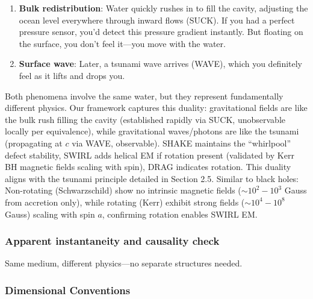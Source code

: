 \begin{enumerate}
\item \textbf{Bulk redistribution}: Water quickly rushes in to fill the cavity, adjusting the ocean level everywhere through inward flows (SUCK). If you had a perfect pressure sensor, you'd detect this pressure gradient instantly. But floating on the surface, you don't feel it---you move with the water.
\item \textbf{Surface wave}: Later, a tsunami wave arrives (WAVE), which you definitely feel as it lifts and drops you.
\end{enumerate}

Both phenomena involve the same water, but they represent fundamentally different physics. Our framework captures this duality: gravitational fields are like the bulk rush filling the cavity (established rapidly via SUCK, unobservable locally per equivalence), while gravitational waves/photons are like the tsunami (propagating at $c$ via WAVE, observable). SHAKE maintains the ``whirlpool'' defect stability, SWIRL adds helical EM if rotation present (validated by Kerr BH magnetic fields scaling with spin), DRAG indicates rotation. This duality aligns with the tsunami principle detailed in Section 2.5. Similar to black holes: Non-rotating (Schwarzschild) show no intrinsic magnetic fields ($\sim 10^2 - 10^3$ Gauss from accretion only), while rotating (Kerr) exhibit strong fields ($\sim 10^4 - 10^8$ Gauss) scaling with spin $a$, confirming rotation enables SWIRL EM.

\subsubsection{Apparent instantaneity and causality check}\label{sec:tsunami-causality}

Same medium, different physics---no separate structures needed.

\medskip
{}

\subsubsection{Dimensional Conventions}
